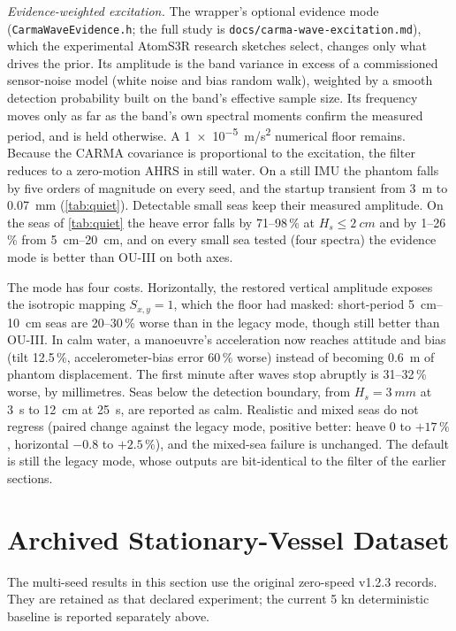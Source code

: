\documentclass[conference]{IEEEtran}
\theoremstyle{bodysmall}
\begin{document}
\emph{Evidence-weighted excitation.} The wrapper's optional evidence mode
(\texttt{CarmaWaveEvidence.h}; the full study is
\texttt{docs/carma-wave-excitation.md}), which the experimental AtomS3R
research sketches select, changes only what drives the prior. Its amplitude
is the band variance in excess of a commissioned sensor-noise model (white
noise and bias random walk), weighted by a smooth detection probability built
on the band's effective sample size. Its frequency moves only as far as the
band's own spectral moments confirm the measured period, and is held
otherwise. A \SI{1e-5}{m/s^2} numerical floor remains. Because the CARMA
covariance is proportional to the excitation, the filter reduces to a
zero-motion AHRS in still water. On a still IMU the phantom falls by five
orders of magnitude on every seed, and the startup transient from
\SI{3}{m} to \SI{0.07}{mm} (\cref{tab:quiet}). Detectable small seas keep
their measured amplitude. On the seas of \cref{tab:quiet} the heave error
falls by 71--98\,\% at $H_s\le\SI{2}{cm}$ and by 1--26\,\% from
\SIrange{5}{20}{cm}, and on every small sea tested (four spectra) the evidence
mode is better than OU-III on both axes.

The mode has four costs. Horizontally, the restored vertical amplitude
exposes the isotropic mapping $S_{x,y}=1$, which the floor had masked:
short-period \SIrange{5}{10}{cm} seas are 20--30\,\% worse than in the legacy
mode, though still better than OU-III. In calm water, a manoeuvre's
acceleration now reaches attitude and bias (tilt 12.5\,\%, accelerometer-bias
error 60\,\% worse) instead of becoming \SI{0.6}{m} of phantom displacement.
The first minute after waves stop abruptly is 31--32\,\% worse, by
millimetres. Seas below the detection boundary, from $H_s=\SI{3}{mm}$ at
\SI{3}{s} to \SI{12}{cm} at \SI{25}{s}, are reported as calm. Realistic and
mixed seas do not regress (paired change against the legacy mode, positive
better: heave 0 to $+17\,\%$, horizontal $-0.8$ to $+2.5\,\%$), and the
mixed-sea failure is unchanged. The default is still the legacy mode, whose
outputs are bit-identical to the filter of the earlier sections.

\section{Archived Stationary-Vessel Dataset}
The multi-seed results in this section use the original zero-speed v1.2.3
records. They are retained as that declared experiment; the current
5 kn deterministic baseline is reported separately above.
\end{document}
